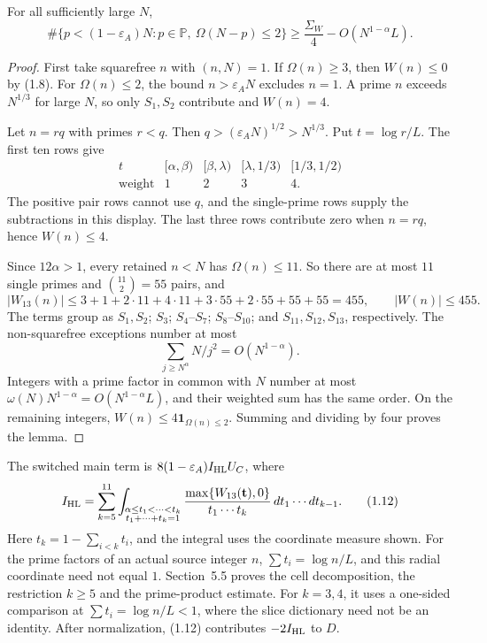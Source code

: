 \begin{lemma}\label{lem:pointwise-count}
For all sufficiently large $N$,
\[
 \#\{p<(1-\varepsilon_A)N:p\in\mathbb P,\ \Omega(N-p)\le2\}
 \ge \frac{\Sigma_W}{4}-O(N^{1-\alpha}L).                 \tag{1.10}
\]
\end{lemma}
\begin{proof}
First take squarefree $n$ with $(n,N)=1$.
If $\Omega(n)\ge3$, then $W(n)\le0$ by (1.8).
For $\Omega(n)\le2$, the bound $n>\varepsilon_A N$ excludes $n=1$.
A prime $n$ exceeds $N^{1/3}$ for large $N$,
so only $S_1,S_2$ contribute and $W(n)=4$.

Let $n=rq$ with primes $r<q$.
Then $q>(\varepsilon_A N)^{1/2}>N^{1/3}$.
Put $t=\log r/L$. The first ten rows give
\[
 \begin{array}{c|cccc}
 t&[\alpha,\beta)&[\beta,\lambda)&[\lambda,1/3)&[1/3,1/2)\\ \hline
 \text{weight}&1&2&3&4.
 \end{array}                                                \tag{1.11}
\]
The positive pair rows cannot use $q$,
and the single-prime rows supply the subtractions in this display.
The last three rows contribute zero when $n=rq$, hence $W(n)\le4$.

Since $12\alpha>1$, every retained $n<N$ has $\Omega(n)\le11$.
So there are at most $11$ single primes and $\binom{11}{2}=55$ pairs, and
\[
 |W_{13}(n)|\le3+1+2\cdot11+4\cdot11
                     +3\cdot55+2\cdot55+55+55=455,
 \qquad |W(n)|\le455.
\]
The terms group as $S_1,S_2$; $S_3$; $S_4$--$S_7$;
$S_8$--$S_{10}$; and $S_{11},S_{12},S_{13}$, respectively.
The non-squarefree exceptions number at most
\[
 \sum_{j\ge N^\alpha}N/j^2=O(N^{1-\alpha}).
\]
Integers with a prime factor in common with $N$ number at most
$\omega(N)N^{1-\alpha}=O(N^{1-\alpha}L)$,
and their weighted sum has the same order.
On the remaining integers,
$W(n)\le4\mathbf1_{\Omega(n)\le2}$.
Summing and dividing by four proves the lemma.
\end{proof}

The switched main term is $8(1-\varepsilon_A)I_{\rm HL}U_C$, where
\[
 I_{\rm HL}=\sum_{k=5}^{11}
   \int_{\substack{\alpha\le t_1<\cdots<t_k\\t_1+\cdots+t_k=1}}
   \frac{\max\{W_{13}(\mathbf t),0\}}{t_1\cdots t_k}
                         \,dt_1\cdots dt_{k-1}.             \tag{1.12}
\]
Here $t_k=1-\sum_{i<k}t_i$, and the integral uses the coordinate measure shown.
For the prime factors of an actual source integer $n$,
$\sum t_i=\log n/L$, and this radial coordinate need not equal $1$.
Section~5.5 proves the cell decomposition, the restriction $k\ge5$
and the prime-product estimate.
For $k=3,4$, it uses a one-sided comparison at $\sum t_i=\log n/L<1$,
where the slice dictionary need not be an identity.
After normalization, (1.12) contributes $-2I_{\rm HL}$ to $D$.

